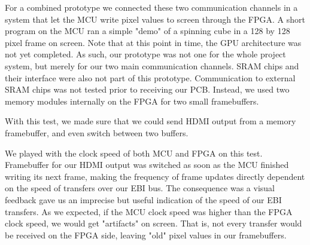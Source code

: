 \documentclass[../main/report.tex]{subfiles}
\begin{document}
For a combined prototype we connected these two communication channels in a system that let the MCU write pixel values to screen through the FPGA.
A short program on the MCU ran a simple "demo" of a spinning cube in a 128 by 128 pixel frame on screen.
Note that at this point in time, the GPU architecture was not yet completed.
As such, our prototype was not one for the whole project system, but merely for our two main communication channels.
SRAM chips and their interface were also not part of this prototype.
Communication to external SRAM chips was not tested prior to receiving our PCB.
Instead, we used two memory modules internally on the FPGA for two small framebuffers.

With this test, we made sure that we could send HDMI output from a memory framebuffer, and even switch between two buffers. 

We played with the clock speed of both MCU and FPGA on this test.
Framebuffer for our HDMI output was switched as soon as the MCU finished writing its next frame, making the frequency of frame updates directly dependent on the speed of transfers over our EBI bus.
The consequence was a visual feedback gave us an imprecise but useful indication of the speed of our EBI transfers.
As we expected, if the MCU clock speed was higher than the FPGA clock speed, we would get "artifacts" on screen.
That is, not every transfer would be received on the FPGA side, leaving "old" pixel values in our framebuffers.
\end{document}
